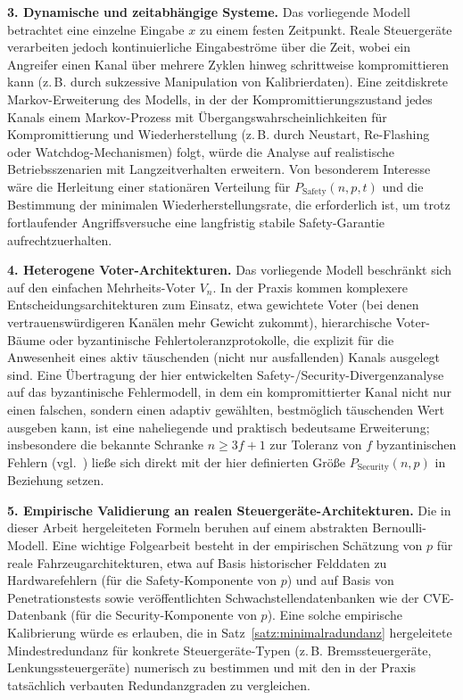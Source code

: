 ﻿\documentclass[a4paper,12pt]{article}
\theoremstyle{definition}
\begin{document}
\textbf{3. Dynamische und zeitabhängige Systeme.} Das vorliegende Modell betrachtet eine einzelne Eingabe $x$ zu einem festen Zeitpunkt. Reale Steuergeräte verarbeiten jedoch kontinuierliche Eingabeströme über die Zeit, wobei ein Angreifer einen Kanal über mehrere Zyklen hinweg schrittweise kompromittieren kann (z.\,B. durch sukzessive Manipulation von Kalibrierdaten). Eine zeitdiskrete Markov-Erweiterung des Modells, in der der Kompromittierungszustand jedes Kanals einem Markov-Prozess mit Übergangswahrscheinlichkeiten für Kompromittierung und Wiederherstellung (z.\,B. durch Neustart, Re-Flashing oder Watchdog-Mechanismen) folgt, würde die Analyse auf realistische Betriebsszenarien mit Langzeitverhalten erweitern. Von besonderem Interesse wäre die Herleitung einer stationären Verteilung für $P_{\mathrm{Safety}}(n,p,t)$ und die Bestimmung der minimalen Wiederherstellungsrate, die erforderlich ist, um trotz fortlaufender Angriffsversuche eine langfristig stabile Safety-Garantie aufrechtzuerhalten.

\textbf{4. Heterogene Voter-Architekturen.} Das vorliegende Modell beschränkt sich auf den einfachen Mehrheits-Voter $V_n$. In der Praxis kommen komplexere Entscheidungsarchitekturen zum Einsatz, etwa gewichtete Voter (bei denen vertrauenswürdigeren Kanälen mehr Gewicht zukommt), hierarchische Voter-Bäume oder byzantinische Fehlertoleranzprotokolle, die explizit für die Anwesenheit eines aktiv täuschenden (nicht nur ausfallenden) Kanals ausgelegt sind. Eine Übertragung der hier entwickelten Safety-/Security-Divergenzanalyse auf das byzantinische Fehlermodell, in dem ein kompromittierter Kanal nicht nur einen falschen, sondern einen adaptiv gewählten, bestmöglich täuschenden Wert ausgeben kann, ist eine naheliegende und praktisch bedeutsame Erweiterung; insbesondere die bekannte Schranke $n \geq 3f+1$ zur Toleranz von $f$ byzantinischen Fehlern (vgl.\ \cite{lamport1982}) ließe sich direkt mit der hier definierten Größe $P_{\mathrm{Security}}(n,p)$ in Beziehung setzen.

\textbf{5. Empirische Validierung an realen Steuergeräte-Architekturen.} Die in dieser Arbeit hergeleiteten Formeln beruhen auf einem abstrakten Bernoulli-Modell. Eine wichtige Folgearbeit besteht in der empirischen Schätzung von $p$ für reale Fahrzeugarchitekturen, etwa auf Basis historischer Felddaten zu Hardwarefehlern (für die Safety-Komponente von $p$) und auf Basis von Penetrationstests sowie veröffentlichten Schwachstellendatenbanken wie der CVE-Datenbank (für die Security-Komponente von $p$). Eine solche empirische Kalibrierung würde es erlauben, die in Satz~\ref{satz:minimalradundanz} hergeleitete Mindestredundanz für konkrete Steuergeräte-Typen (z.\,B. Bremssteuergeräte, Lenkungssteuergeräte) numerisch zu bestimmen und mit den in der Praxis tatsächlich verbauten Redundanzgraden zu vergleichen.
\end{document}
